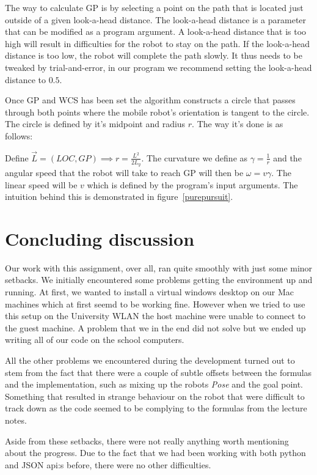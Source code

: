 \documentclass[12pt]{article}
\begin{document}
The way to calculate GP is by selecting a point on the path that is located
just outside of a given look-a-head distance. The look-a-head distance is a
parameter that can be modified as a program argument. A look-a-head
distance that is too high will result in difficulties for the robot to stay on the path.
If the look-a-head distance is too low, the robot will complete the path slowly. It thus needs
to be tweaked by trial-and-error, in our program we recommend setting the look-a-head
distance to $0.5$.

Once GP and WCS has been set the algorithm constructs a circle that passes
through both points where the mobile robot's orientation is tangent to the
circle. The circle is defined by it's midpoint and radius $r$. The way it's done is
as follows:

Define $\vec{L} = (LOC, GP) \implies r = \frac{L^2}{2L_{y}}$. The curvature we
define as $\gamma = \frac{1}{r}$ and the angular speed that the robot will
take to reach GP will then be $\omega = v\gamma$. The linear speed will 
be $v$ which is defined by the program's input arguments. The intuition behind
this is demonstrated in figure~\ref{purepursuit}.


\section{Concluding discussion}

Our work with this assignment, over all, ran quite smoothly with just
some minor setbacks. We initially encountered some problems getting
the environment up and running. At first, we wanted to install a
virtual windows desktop on our Mac machines which at first seemd to
be working fine. However when we tried to use this setup on the University
WLAN the host machine were unable to connect to the guest machine. A problem
that we in the end did not solve but we ended up writing all of our code on
the school computers.

All the other problems we encountered during the development turned out
to stem from the fact that there were a couple of subtle offsets between
the formulas and the implementation, such as mixing up the robots
\textit{Pose} and the goal point. Something that resulted in strange
behaviour on the robot that were difficult to track down as the code
seemed to be complying to the formulas from the lecture notes.

Aside from these setbacks, there were not really anything worth mentioning
about the progress. Due to the fact that we had been working with both python
and JSON api:s before, there were no other difficulties.




\end{document}
